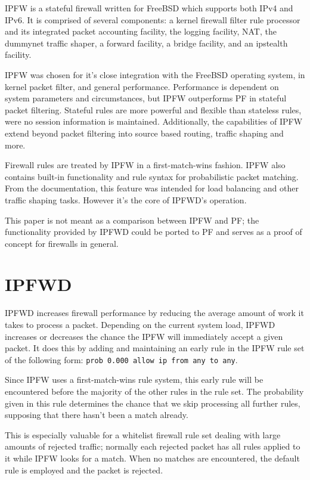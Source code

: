 \documentclass[journal]{IEEEtran}
\begin{document}
IPFW is a stateful firewall written for FreeBSD which supports both IPv4 and
IPv6. It is comprised of several components: a kernel firewall filter rule
processor and its integrated packet accounting facility, the logging facility,
NAT, the dummynet traffic shaper, a forward facility, a bridge facility, and
an ipstealth facility.

IPFW was chosen for it's close integration with the FreeBSD operating system,
in kernel packet filter, and general performance. Performance is dependent on
system parameters and circumstances, but IPFW outperforms PF in stateful packet
filtering. Stateful rules are more powerful and flexible than stateless rules,
were no session information is maintained. Additionally, the capabilities of
IPFW extend beyond packet filtering into source based routing, traffic shaping
and more. 

Firewall rules are treated by IPFW in a first-match-wins fashion. IPFW also
contains built-in functionality and rule syntax for probabilistic packet
matching. From the documentation, this feature was intended for load balancing
and other traffic shaping tasks. However it's the core of IPFWD's operation. 

This paper is not meant as a comparison between IPFW and PF; the functionality
provided by IPFWD could be ported to PF and serves as a proof of concept for
firewalls in general.


\section{IPFWD}

IPFWD increases firewall performance by reducing the average amount of work it
takes to process a packet. Depending on the current system load, IPFWD
increases or decreases the chance the IPFW will immediately accept a given
packet. It does this by adding and maintaining an early rule in the IPFW rule
set of the following form: \verb|prob 0.000 allow ip from any to any|. 

Since IPFW uses a first-match-wins rule system, this early rule will be
encountered before the majority of the other rules in the rule set.  The
probability given in this rule determines the chance that we skip processing
all further rules, supposing that there hasn't been a match already.  

This is especially valuable for a whitelist firewall rule set dealing with
large amounts of rejected traffic; normally each rejected packet has all rules
applied to it while IPFW looks for a match.  When no matches are encountered,
the default rule is employed and the packet is rejected. 
\end{document}
